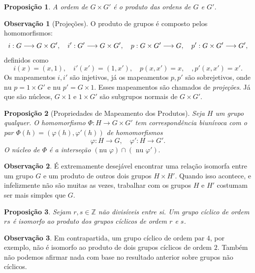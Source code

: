 \documentclass[a4paper,12pt]{report}
\theoremstyle{plain}
\newtheorem{proposicao}{Proposição}[section]
\theoremstyle{definition}
\newtheorem{observacao}{Observação}[section]
\begin{document}
	\begin{proposicao}
		A ordem de \(G\times G'\) é o produto das ordens de
		\(G\) e \(G'\).	
	\end{proposicao}
	
	\begin{observacao}[Projeções]
		O produto de grupos é composto pelos homomorfismos:
		\[i: G\longrightarrow G\times G', \quad i': G'\longrightarrow G\times G', \newline \quad p: G\times G'\longrightarrow G, \quad p': G\times G'\longrightarrow G',\]
		definidos como
		\[i(x) = (x,1), \quad i'(x') = (1,x'), \quad p(x,x') = x, \quad, p'(x,x') = x'.\]
		Os mapeamentos \(i,i'\) são injetivos, já os mapeamentos \(p,p'\) são
		sobrejetivos, onde \(\text{nu }p = 1\times G'\) e
		\(\text{nu }p' = G\times 1\). Esses mapeamentos são chamados de
		\emph{projeções}. Já que são núcleos, \(G\times 1\) e \(1\times G'\)
		são subgrupos normais de \(G\times G'\).
	\end{observacao}
	
	\begin{proposicao}[Propriedades de Mapeamento dos Produtos]
		Seja
		\(H\) um grupo qualquer. O homomorfismo
		\(\Phi: H\longrightarrow G\times G'\) tem correspondência biunívoca com
		o par $ \Phi(h) = (\varphi(h), \varphi'(h))$ de homomorfismos
		\[\varphi:H\longrightarrow G, \quad \varphi': H\longrightarrow G'.\]
		O núcleo de \(\Phi\) é a interseção
		\((\text{nu }\varphi)\cap(\text{ nu }\varphi').\)	
	\end{proposicao}
	
	\begin{observacao}
		É extremamente desejável encontrar uma relação isomorfa entre um grupo
		\(G\) e um produto de outros dois grupos \(H\times H'\). Quando isso
		acontece, e infelizmente não são muitas as vezes, trabalhar com os
		grupos \(H\) e \(H'\) costumam ser mais simples que \(G\).
	\end{observacao}
	
	\begin{proposicao}
		Sejam \(r,s\in\mathbb{Z}\) não divisíveis entre si.
		Um grupo cíclico de ordem \(rs\) é isomorfo ao produto dos grupos
		cíclicos de ordem \(r\) e \(s\).	
	\end{proposicao}
	
	\begin{observacao}
		Em contrapartida, um grupo cíclico de ordem par \(4\), por exemplo, não
		é isomorfo ao produto de dois grupos cíclicos de ordem \(2\). Também não
		podemos afirmar nada com base no resultado anterior sobre grupos não
		cíclicos.
	\end{observacao}
	
\end{document}
